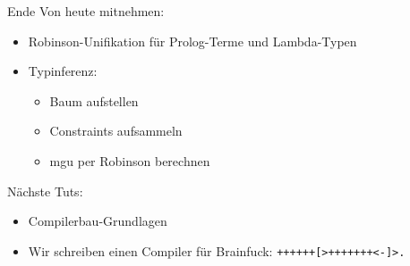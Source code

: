 \documentclass{beamer}
\begin{document}
\begin{frame}{Ende}
  Von heute mitnehmen:

  \begin{itemize}
    \item Robinson-Unifikation für Prolog-Terme und Lambda-Typen
    \item Typinferenz:
    \begin{itemize}
      \item Baum aufstellen
      \item Constraints aufsammeln
      \item mgu per Robinson berechnen
    \end{itemize}
  \end{itemize}

  Nächste Tuts:

  \begin{itemize}
    \item Compilerbau-Grundlagen
    \item Wir schreiben einen Compiler für Brainfuck: \texttt{++++++[>+++++++<-]>.}
  \end{itemize}
\end{frame}
\end{document}
